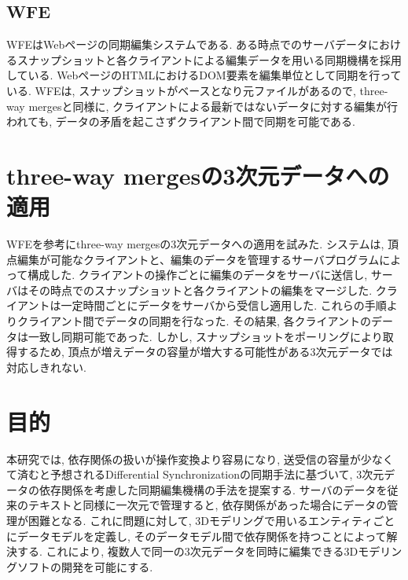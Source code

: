 \subsection{WFE}
WFE\cite{WFE}はWebページの同期編集システムである. ある時点でのサーバデータにおけるスナップショットと各クライアントによる編集データを用いる同期機構を採用している. WebページのHTMLにおけるDOM要素を編集単位として同期を行っている. WFEは, スナップショットがベースとなり元ファイルがあるので, three-way mergesと同様に, クライアントによる最新ではないデータに対する編集が行われても, データの矛盾を起こさずクライアント間で同期を可能である.
\section{three-way mergesの3次元データへの適用}
WFEを参考にthree-way mergesの3次元データへの適用を試みた.
システムは, 頂点編集が可能なクライアントと、編集のデータを管理するサーバプログラムによって構成した. クライアントの操作ごとに編集のデータをサーバに送信し, サーバはその時点でのスナップショットと各クライアントの編集をマージした. クライアントは一定時間ごとにデータをサーバから受信し適用した. これらの手順よりクライアント間でデータの同期を行なった. その結果, 各クライアントのデータは一致し同期可能であった. しかし, スナップショットをポーリングにより取得するため, 頂点が増えデータの容量が増大する可能性がある3次元データでは対応しきれない.
\section{目的}
本研究では, 依存関係の扱いが操作変換より容易になり, 送受信の容量が少なくて済むと予想されるDifferential Synchronizationの同期手法に基づいて, 3次元データの依存関係を考慮した同期編集機構の手法を提案する.
サーバのデータを従来のテキストと同様に一次元で管理すると, 依存関係があった場合にデータの管理が困難となる. これに問題に対して, 3Dモデリングで用いるエンティティごとにデータモデルを定義し, そのデータモデル間で依存関係を持つことによって解決する. これにより, 複数人で同一の3次元データを同時に編集できる3Dモデリングソフトの開発を可能にする.
